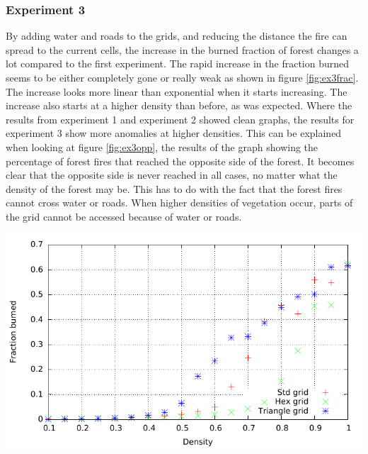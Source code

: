 \documentclass{article}
\newenvironment{Figure}
  {\par\medskip\noindent\minipage{\linewidth}}
  {\endminipage\par\medskip}
\begin{document}
\begin{multicols}{2}
\subsubsection*{Experiment 3}
By adding water and roads to the grids, and reducing the distance the fire can spread to the current cells, the increase in the burned fraction of forest changes a lot compared to the first experiment. The rapid increase in the fraction burned seems to be either completely gone or really weak as shown in figure \ref{fig:ex3frac}. The increase looks more linear than exponential when it starts increasing. The increase also starts at a higher density than before, as was expected. Where the results from experiment 1 and experiment 2 showed clean graphs, the results for experiment 3 show more anomalies at higher densities. This can be explained when looking at figure \ref{fig:ex3opp}, the results of the graph showing the percentage of forest fires that reached the opposite side of the forest. It becomes clear that the opposite side is never reached in all cases, no matter what the density of the forest may be. This has to do with the fact that the forest fires cannot cross water or roads. When higher densities of vegetation occur, parts of the grid cannot be accessed because of water or roads.
\begin{Figure}
 \centering
 \includegraphics[width=\textwidth]{imgs/plot/ex3/fracburned.pdf}
\label{fig:ex3frac}
\end{Figure}


\end{multicols}
\end{document}
